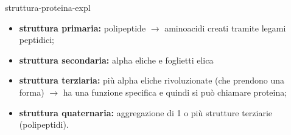\documentclass[preview]{standalone}
\begin{document}

\begin{snippet}{struttura-proteina-expl}
    \begin{itemize}
        \item \textbf{struttura primaria:} polipeptide \(\rightarrow\) aminoacidi creati tramite legami peptidici;
        \item \textbf{struttura secondaria:} alpha eliche e foglietti elica
        \item \textbf{struttura terziaria:} più alpha eliche rivoluzionate (che prendono una forma) \(\rightarrow\) ha una funzione specifica
        e quindi si può chiamare proteina;
        \item \textbf{struttura quaternaria:} aggregazione di 1 o più strutture terziarie (polipeptidi).
    \end{itemize}
\end{snippet}
\end{document}
